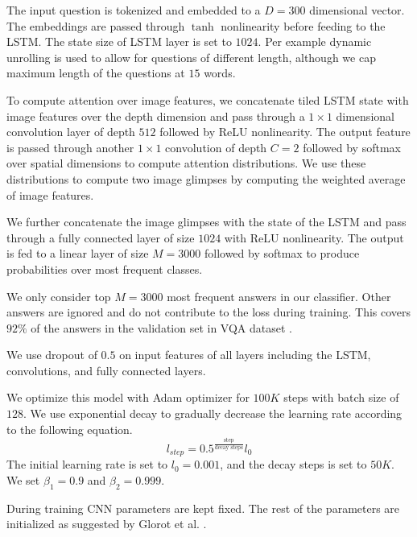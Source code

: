 \documentclass[10pt,twocolumn,letterpaper]{article}
\begin{document}
The input question is tokenized and embedded to a $D = 300$ dimensional vector. The embeddings are passed through $\tanh$ nonlinearity before feeding to the LSTM. The state size of LSTM layer is set to $1024$. Per example dynamic unrolling is used to allow for questions of different length, although we cap maximum length of the questions at $15$ words.

To compute attention over image features, we concatenate tiled LSTM state with image features over the depth dimension and pass through a $1 \times 1$ dimensional convolution layer of depth $512$ followed by ReLU \cite{Nair2010RectifiedLU} nonlinearity. The output feature is passed through another $1 \times 1$ convolution of depth $C = 2$ followed by softmax over spatial dimensions to compute attention distributions. We use these distributions to compute two image glimpses by computing the weighted average of image features.

We further concatenate the image glimpses with the state of the LSTM and pass through a fully connected layer of size $1024$ with ReLU nonlinearity. The output is fed to a linear layer of size $M = 3000$ followed by softmax to produce probabilities over most frequent classes.

We only consider top $M = 3000$ most frequent answers in our classifier. Other answers are ignored and do not contribute to the loss during training. This covers $92\%$ of the answers in the validation set in VQA dataset \cite{Antol2015VQAVQ}.

We use dropout of $0.5$ on input features of all layers including the LSTM, convolutions, and fully connected layers.

We optimize this model with Adam optimizer \cite{Kingma2014AdamAM} for $100K$ steps with batch size of $128$. We use exponential decay to gradually decrease the learning rate according to the following equation.
$$
l_{step} = 0.5^{\frac{\text{step}}{\text{decay steps}}} l_0
$$
The initial learning rate is set to $l_0 = 0.001$, and the decay steps is set to $50K$. We set $\beta_1 = 0.9$ and $\beta_2 = 0.999$.

During training CNN parameters are kept fixed. The rest of the parameters are initialized as suggested by Glorot et al. \cite{Glorot2010UnderstandingTD}.
\end{document}
